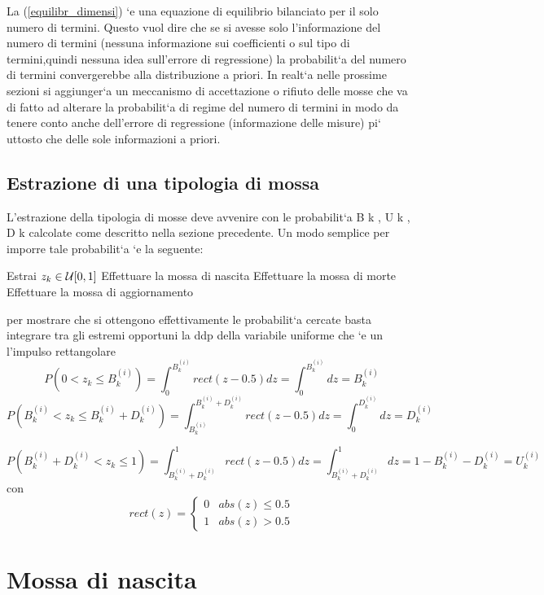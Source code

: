La (\ref{equilibr_dimensi}) `e una equazione di equilibrio bilanciato per il solo numero di termini.
Questo vuol dire che se si avesse solo l’informazione del numero di termini (nessuna
informazione sui coefficienti o sul tipo di termini,quindi nessuna idea sull’errore di
regressione) la probabilit`a del numero di termini convergerebbe alla distribuzione a
priori. In realt`a nelle prossime sezioni si aggiunger`a un meccanismo di accettazione
o rifiuto delle mosse che va di fatto ad alterare la probabilit`a di regime del numero
di termini in modo da tenere conto anche dell’errore di regressione (informazione
delle misure) pi`
uttosto che delle sole informazioni a priori.
\subsection{Estrazione di una tipologia di mossa}
L’estrazione della tipologia di mosse deve avvenire con le probabilit`a B k , U k , D k
calcolate come descritto nella sezione precedente. Un modo semplice per imporre
tale probabilit`a `e la seguente:\\

\begin{algorithmic}
\State Estrai $z_k\in\mathcal{U}[0,1]$
\State Effettuare la mossa di nascita
\State Effettuare la mossa di morte
\Else
\State Effettuare la mossa di aggiornamento
\EndIf
\end{algorithmic}
per mostrare che si ottengono effettivamente le probabilit`a cercate basta integrare
tra gli estremi opportuni la ddp della variabile uniforme che `e un l’impulso
rettangolare
\begin{equation}
P\left(0<z_k\leq B_k^{(i)}\right)=\int_0^{B_k^{(i)}}rect(z-0.5)dz=\int_0^{B_k^{(i)}}dz={B_k^{(i)}}
\end{equation}
\begin{equation}
P\left(B_k^{(i)}<z_k\leq B_k^{(i)}+D_k^{(i)}\right)=\int_{B_k^{(i)}}^{B_k^{(i)}+D_k^{(i)}}rect(z-0.5)dz=\int_0^{D_k^{(i)}}dz={D_k^{(i)}}
\end{equation}

\begin{equation}
P\left(B_k^{(i)}+D_k^{(i)}<z_k\leq 1 \right)=\int_{B_k^{(i)}+D_k^{(i)}}^{1}rect(z-0.5)dz=\int_{B_k^{(i)}+D_k^{(i)}}^{1}dz=1-{B_k^{(i)}}-{D_k^{(i)}}=U_k^{(i)}
\end{equation}
con
\begin{equation}
rect(z)=\begin{cases}
0 & abs(z)\leq 0.5\\
1 & abs(z)>0.5 
\end{cases}
\end{equation}

\section{Mossa di nascita}